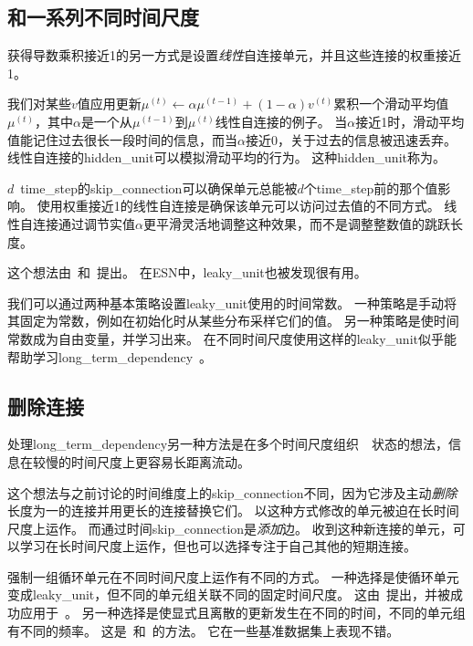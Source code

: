 
\subsection{和一系列不同时间尺度}
\label{sec:leaky_units_and_a_spectrum_of_different_time_scales}
获得导数乘积接近1的另一方式是设置\emph{线性}自连接单元，并且这些连接的权重接近1。

我们对某些$v$值应用更新$\mu^{(t)} \gets \alpha \mu^{(t-1)} + (1-\alpha) v^{(t)}$累积一个滑动平均值$\mu^{(t)}$，其中$\alpha$是一个从$ \mu^{(t-1)}$到$ \mu^{(t)}$线性自连接的例子。
当$\alpha$接近1时，滑动平均值能记住过去很长一段时间的信息，而当$\alpha$接近0，关于过去的信息被迅速丢弃。
线性自连接的\gls{hidden_unit}可以模拟滑动平均的行为。
这种\gls{hidden_unit}称为。

$d$~\gls{time_step}的\gls{skip_connection}可以确保单元总能被$d$个\gls{time_step}前的那个值影响。
使用权重接近1的线性自连接是确保该单元可以访问过去值的不同方式。
线性自连接通过调节实值$\alpha$更平滑灵活地调整这种效果，而不是调整整数值的跳跃长度。

这个想法由~\cite{Mozer-1992}和~\cite{Hihi-Bengio-1996}提出。
在\gls{ESN}中，\gls{leaky_unit}也被发现很有用\citep{Jaeger-et-al-2007}。

我们可以通过两种基本策略设置\gls{leaky_unit}使用的时间常数。
一种策略是手动将其固定为常数，例如在初始化时从某些分布采样它们的值。
另一种策略是使时间常数成为自由变量，并学习出来。
在不同时间尺度使用这样的\gls{leaky_unit}似乎能帮助学习\gls{long_term_dependency}~\citep{Mozer-1992,Pascanu-et-al-2013}。

\subsection{删除连接}
\label{sec:removing_connections}
处理\gls{long_term_dependency}另一种方法是在多个时间尺度组织~~状态的想法\citep{Hihi-Bengio-1996}，信息在较慢的时间尺度上更容易长距离流动。

这个想法与之前讨论的时间维度上的\gls{skip_connection}不同，因为它涉及主动\emph{删除}长度为一的连接并用更长的连接替换它们。
以这种方式修改的单元被迫在长时间尺度上运作。
而通过时间\gls{skip_connection}是\emph{添加}边。
收到这种新连接的单元，可以学习在长时间尺度上运作，但也可以选择专注于自己其他的短期连接。


强制一组循环单元在不同时间尺度上运作有不同的方式。
一种选择是使循环单元变成\gls{leaky_unit}，但不同的单元组关联不同的固定时间尺度。
这由~\cite{Mozer-1992}提出，并被成功应用于~\cite{Pascanu-et-al-2013}。
另一种选择是使显式且离散的更新发生在不同的时间，不同的单元组有不同的频率。
这是~\cite{Hihi-Bengio-1996}和~\cite{Koutnik-et-al-2014}的方法。
它在一些基准数据集上表现不错。

